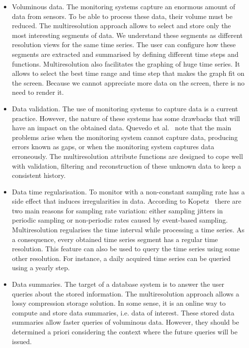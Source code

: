 \begin{itemize}

\item Voluminous data. The monitoring systems capture an enormous
  amount of data from sensors. To be able to process these data, their
  volume must be reduced. The multiresolution approach allows to
  select and store only the most interesting segments of data. We
  understand these segments as different resolution views for the same
  time series. The user can configure how these segments are extracted
  and summarised by defining different time steps and
  functions. Multiresolution also facilitates the graphing of huge
  time series. It allows to select the best time range and time step
  that makes the graph fit on the screen. Because we cannot appreciate
  more data on the screen, there is no need to render it.

\item Data validation. The use of monitoring systems to capture data
  is a current practice. However, the nature of these systems has some
  drawbacks that will have an impact on the obtained data. Quevedo et
  al.~\cite{quevedo10} note that the main problems arise when the
  monitoring system cannot capture data, producing errors known as
  gaps, or when the monitoring system captures data erroneously.  The
  multiresolution attribute functions are designed to cope well with
  validation, filtering and reconstruction of these unknown data to
  keep a consistent history.

\item Data time regularisation. To monitor with a non-constant
  sampling rate has a side effect that induces irregularities in
  data. According to Kopetz~\cite{kopetz11:realtime} there are two
  main reasons for sampling rate variation: either sampling jitters in
  periodic sampling or non-periodic rates caused by event-based
  sampling.  Multiresolution regularises the time interval while
  processing a time series. As a consequence, every obtained time
  series segment has a regular time resolution. This feature can also
  be used to query the time series using some other resolution. For
  instance, a daily acquired time series can be queried using a yearly
  step.

\item Data summaries. The target of a database system is to answer the
  user queries about the stored information. The multiresolution
  approach allows a lossy compression storage solution. In some sense,
  it is an online way to compute and store data summaries, i.e. data
  of interest. These stored data summaries allow faster queries of
  voluminous data. However, they should be determined a priori
  considering the context where the future queries will be issued.

\end{itemize}



